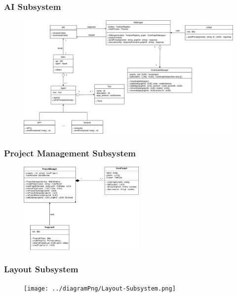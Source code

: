 \documentclass[11pt,a4paper]{article}
\begin{document}
\subsubsection*{AI Subsystem}
\begin{figure}[htbp]
    \centering
    \includegraphics[width=1.1\textwidth]{../diagramPng/AI-subsystem.png}
\end{figure}

\clearpage

\subsubsection*{Project Management Subsystem}
\begin{figure}[htbp]
    \centering
    \includegraphics[width=0.55\textwidth]{../diagramPng/Project-subsystem.png}
\end{figure}

\subsubsection*{Layout Subsystem}
\begin{figure}[htbp]
    \centering
      \texttt{[image: ../diagramPng/Layout-Subsystem.png]}
\end{figure}
\end{document}
